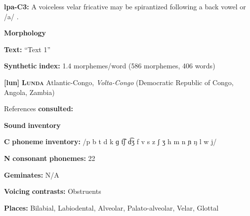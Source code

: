 \begin{styleBody}
\textbf{lpa-C3:} A voiceless velar fricative may be spirantized following a back vowel or /a/ \citep[20]{Lacrampe2014}.
\end{styleBody}

\begin{styleBody}
\textbf{Morphology}
\end{styleBody}

\begin{styleBody}
\textbf{Text:} “Text 1” \citep[495-500]{Lacrampe2014}
\end{styleBody}

\begin{styleBody}
\textbf{Synthetic} \textbf{index:} 1.4 morphemes/word (586 morphemes, 406 words)
\end{styleBody}

\begin{styleBody}
\textbf{[lun]}   \textbf{\textsc{Lunda}  }  Atlantic-Congo, \textit{Volta-Congo} (Democratic Republic of Congo, Angola, Zambia)
\end{styleBody}

\begin{styleBody}
References \textbf{consulted:} \citet{Kawasha2003}
\end{styleBody}

\begin{styleBody}
\textbf{Sound} \textbf{inventory}
\end{styleBody}

\begin{styleBody}
\textbf{C} \textbf{phoneme} \textbf{inventory:} /p b t d k ɡ t͡ʃ d͡ʒ f v s z ʃ ʒ h m n ɲ ŋ l w j/
\end{styleBody}

\begin{styleBody}
\textbf{N} \textbf{consonant} \textbf{phonemes:} 22
\end{styleBody}

\begin{styleBody}
\textbf{Geminates:} N/A
\end{styleBody}

\begin{styleBody}
\textbf{Voicing} \textbf{contrasts:} Obstruents
\end{styleBody}

\begin{styleBody}
\textbf{Places:} Bilabial, Labiodental, Alveolar, Palato-alveolar, Velar, Glottal
\end{styleBody}

